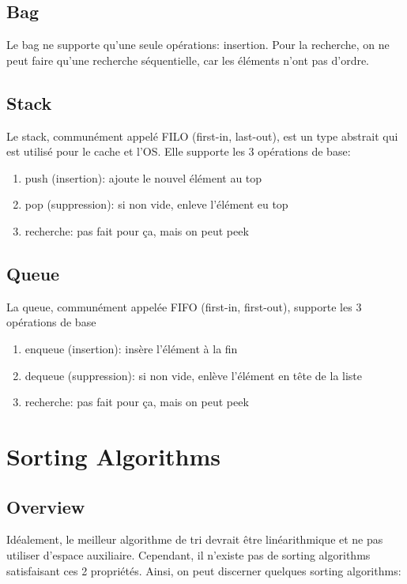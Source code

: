 \documentclass{article}
\begin{document}
\subsection{Bag}

Le bag ne supporte qu'une seule opérations: insertion. Pour la recherche,
on ne peut faire qu'une recherche séquentielle, car les éléments n'ont
pas d'ordre.

\subsection{Stack}

Le stack, communément appelé FILO (first-in, last-out), est un type
abstrait qui est utilisé pour le cache et l'OS. Elle supporte les 3
opérations de base:
\begin{enumerate}
    \item push (insertion): ajoute le nouvel élément au top
    \item pop (suppression): si non vide, enleve l'élément eu top
    \item recherche: pas fait pour ça, mais on peut peek
\end{enumerate}

\subsection{Queue}

La queue, communément appelée FIFO (first-in, first-out), supporte
les 3 opérations de base
\begin{enumerate}
    \item enqueue (insertion): insère l'élément à la fin
    \item dequeue (suppression): si non vide, enlève l'élément en
	tête de la liste
    \item recherche: pas fait pour ça, mais on peut peek
\end{enumerate}

\section{Sorting Algorithms}

\subsection{Overview}

Idéalement, le meilleur algorithme de tri devrait être linéarithmique
et ne pas utiliser d'espace auxiliaire. Cependant, il n'existe pas de
sorting algorithms satisfaisant ces 2 propriétés. Ainsi, on peut
discerner quelques sorting algorithms:
\end{document}
